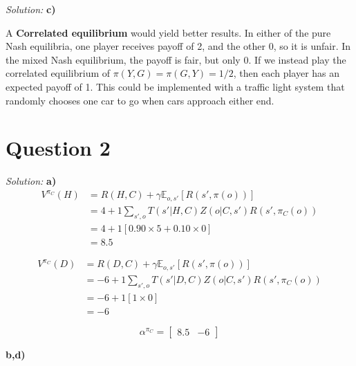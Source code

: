 \documentclass{article}
\theoremstyle{definition}
\newenvironment{solution}{\noindent\textit{Solution:}}{}
\begin{document}
\begin{solution}
\textbf{c)}

A \textbf{Correlated equilibrium} would yield better results. In either of the pure Nash equilibria, one player receives payoff of 2, and the other 0, so it is unfair. In the mixed Nash equilibrium, the payoff is fair, but only 0. If we instead play the correlated equilibrium of $\pi(Y,G) = \pi(G,Y) = 1/2$, then each player has an expected payoff of 1. This could be implemented with a traffic light system that randomly chooses one car to go when cars approach either end.
\end{solution}


\newpage
\section*{Question 2}
\begin{solution}
\textbf{a)}
\begin{equation}
\begin{aligned}
    V^{\pi_C}(H) &= R(H,C) + \gamma \mathbb{E}_{o, s'}\left[R(s', \pi(o))\right] \\
    &= 4 + 1\sum_{s', o}T(s' | H, C) Z(o | C, s') R(s', \pi_C(o)) \\
    &= 4 + 1\left[0.90 \times 5 + 0.10 \times 0\right] \\
    &= 8.5
\end{aligned}
\end{equation}

\begin{equation}
\begin{aligned}
    V^{\pi_C}(D) &= R(D,C) + \gamma \mathbb{E}_{o, s'}\left[R(s', \pi(o))\right] \\
    &= -6 + 1\sum_{s', o}T(s' | D, C) Z(o | C, s') R(s', \pi_C(o)) \\
    &= -6 + 1\left[1 \times 0\right] \\
    &= -6
\end{aligned}
\end{equation}

\begin{equation}
    \boxed{\alpha^{\pi_C} = \begin{bmatrix}
        8.5 & -6
    \end{bmatrix}}
\end{equation}

\textbf{b,d)}

\begin{center}
\end{center}
\end{solution}
\end{document}
